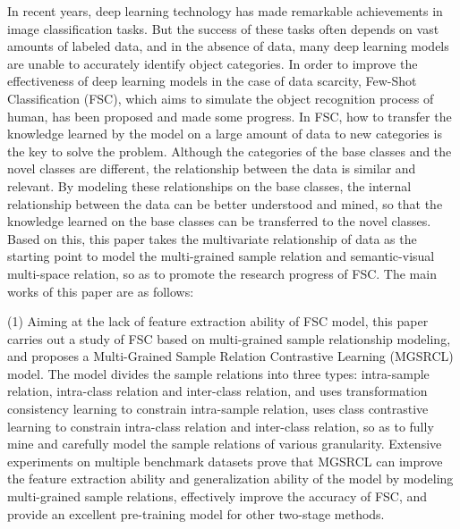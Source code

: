 \begin{eabstract}	%

In recent years, deep learning technology has made remarkable achievements in image classification tasks. But the success of these tasks often depends on vast amounts of labeled data, and in the absence of data, many deep learning models are unable to accurately identify object categories. In order to improve the effectiveness of deep learning models in the case of data scarcity, Few-Shot Classification (FSC), which aims to simulate the object recognition process of human, has been proposed and made some progress. In FSC, how to transfer the knowledge learned by the model on a large amount of data to new categories is the key to solve the problem. Although the categories of the base classes and the novel classes are different, the relationship between the data is similar and relevant. By modeling these relationships on the base classes, the internal relationship between the data can be better understood and mined, so that the knowledge learned on the base classes can be transferred to the novel classes. Based on this, this paper takes the multivariate relationship of data as the starting point to model the multi-grained sample relation and semantic-visual multi-space relation, so as to promote the research progress of FSC. The main works of this paper are as follows:

(1) Aiming at the lack of feature extraction ability of FSC model, this paper carries out a study of FSC based on multi-grained sample relationship modeling, and proposes a Multi-Grained Sample Relation Contrastive Learning (MGSRCL) model. The model divides the sample relations into three types: intra-sample relation, intra-class relation and inter-class relation, and uses transformation consistency learning to constrain intra-sample relation, uses class contrastive learning to constrain intra-class relation and inter-class relation, so as to fully mine and carefully model the sample relations of various granularity. Extensive experiments on multiple benchmark datasets prove that MGSRCL can improve the feature extraction ability and generalization ability of the model by modeling multi-grained sample relations, effectively improve the accuracy of FSC, and provide an excellent pre-training model for other two-stage methods.


\end{eabstract}
